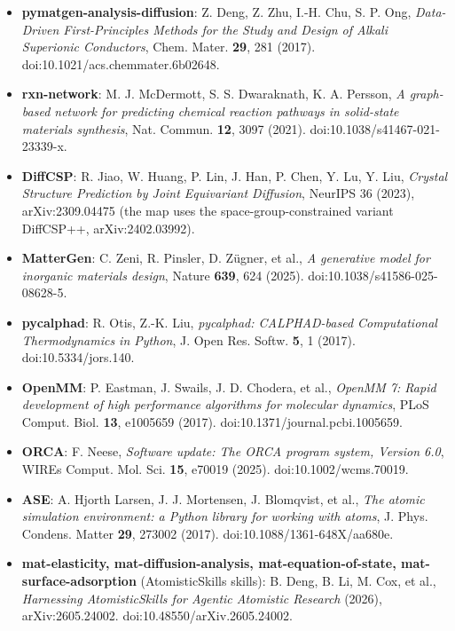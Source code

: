 \documentclass[11pt,a4paper]{article}
\begin{document}
\begin{itemize}[leftmargin=1.4em, itemsep=0.25em]
  \item \textbf{pymatgen-analysis-diffusion}: Z. Deng, Z. Zhu, I.-H. Chu,
        S. P. Ong, \emph{Data-Driven First-Principles Methods for the Study and
        Design of Alkali Superionic Conductors}, Chem. Mater. \textbf{29}, 281
        (2017). doi:10.1021/acs.chemmater.6b02648.
  \item \textbf{rxn-network}: M. J. McDermott, S. S. Dwaraknath, K. A. Persson,
        \emph{A graph-based network for predicting chemical reaction pathways in
        solid-state materials synthesis}, Nat. Commun. \textbf{12}, 3097 (2021).
        doi:10.1038/s41467-021-23339-x.
  \item \textbf{DiffCSP}: R. Jiao, W. Huang, P. Lin, J. Han, P. Chen, Y. Lu,
        Y. Liu, \emph{Crystal Structure Prediction by Joint Equivariant
        Diffusion}, NeurIPS 36 (2023), arXiv:2309.04475 (the map uses the
        space-group-constrained variant DiffCSP++, arXiv:2402.03992).
  \item \textbf{MatterGen}: C. Zeni, R. Pinsler, D. Z\"ugner, et al.,
        \emph{A generative model for inorganic materials design}, Nature
        \textbf{639}, 624 (2025). doi:10.1038/s41586-025-08628-5.
  \item \textbf{pycalphad}: R. Otis, Z.-K. Liu, \emph{pycalphad: CALPHAD-based
        Computational Thermodynamics in Python}, J. Open Res. Softw. \textbf{5},
        1 (2017). doi:10.5334/jors.140.
  \item \textbf{OpenMM}: P. Eastman, J. Swails, J. D. Chodera, et al.,
        \emph{OpenMM 7: Rapid development of high performance algorithms for
        molecular dynamics}, PLoS Comput. Biol. \textbf{13}, e1005659 (2017).
        doi:10.1371/journal.pcbi.1005659.
  \item \textbf{ORCA}: F. Neese, \emph{Software update: The ORCA program system,
        Version 6.0}, WIREs Comput. Mol. Sci. \textbf{15}, e70019 (2025).
        doi:10.1002/wcms.70019.
  \item \textbf{ASE}: A. Hjorth Larsen, J. J. Mortensen, J. Blomqvist, et al.,
        \emph{The atomic simulation environment: a Python library for working
        with atoms}, J. Phys. Condens. Matter \textbf{29}, 273002 (2017).
        doi:10.1088/1361-648X/aa680e.
  \item \textbf{mat-elasticity, mat-diffusion-analysis, mat-equation-of-state,
        mat-surface-adsorption} (AtomisticSkills skills): B. Deng, B. Li,
        M. Cox, et al., \emph{Harnessing AtomisticSkills for Agentic Atomistic
        Research} (2026), arXiv:2605.24002. doi:10.48550/arXiv.2605.24002.
\end{itemize}
\end{document}
